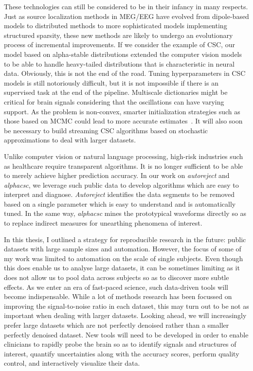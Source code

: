 These technologies can still be considered to be in their infancy in many respects. Just as source localization methods in \ac{MEG}/\ac{EEG} have evolved from dipole-based models to distributed methods to more sophisticated models implementing structured sparsity, these new methods are likely to undergo an evolutionary process of incremental improvements. If we consider the example of \ac{CSC}, our model based on alpha-stable distributions extended the computer vision models to be able to handle heavy-tailed distributions that is characteristic in neural data. Obviously, this is not the end of the road. Tuning hyperparameters in \ac{CSC} models is still notoriously difficult, but it is not impossible if there is an supervised task at the end of the pipeline. Multiscale dictionaries might be critical for brain signals considering that the oscillations can have varying support. As the problem is non-convex, smarter initialization strategies such as those based on \ac{MCMC} could lead to more accurate estimates~\citep{bachem2016fast}. It will also soon be necessary to build streaming \ac{CSC} algorithms based on stochastic approximations to deal with larger datasets.

Unlike computer vision or natural language processing, high-risk industries such as healthcare require transparent algorithms. It is no longer sufficient to be able to merely achieve higher prediction accuracy.
In our work on \emph{autoreject} and \emph{alphacsc}, we leverage such public data to develop algorithms which are easy to interpret and diagnose. \emph{Autoreject} identifies the data segments to be removed based on a single parameter which is easy to understand and is automatically tuned. In the same way, \emph{alphacsc} mines the prototypical waveforms directly so as to replace indirect measures for unearthing phenomena of interest.

In this thesis, I outlined a strategy for reproducible research in the future: public datasets with large sample sizes and automation. However, the focus of some of my work was limited to automation on the scale of single subjects. Even though this does enable us to analyse large datasets, it can be sometimes limiting as it does not allow us to pool data across subjects so as to discover more subtle effects. As we enter an era of fast-paced science, such data-driven tools will become indispensable. While a lot of methods research has been focussed on improving the signal-to-noise ratio in each dataset, this may turn out to be not as important when dealing with larger datasets. Looking ahead, we will increasingly prefer large datasets which are not perfectly denoised rather than a smaller perfectly denoised dataset. New tools will need to be developed in order to enable clinicians to rapidly probe the brain so as to identify signals and structures of interest, quantify uncertainties along with the accuracy scores, perform quality control, and interactively visualize their data.
